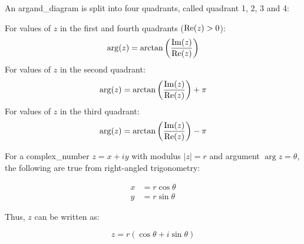        An \gls{argand_diagram} is split into four \glspl{quadrant}, called \gls{quadrant} 1, 2, 3 and 4:

        \begin{center}
        \end{center}


        For values of $z$ in the first and fourth \glspl{quadrant} ($\operatorname{Re}(z)>0$):
        \begin{equation}
            \arg(z)=\arctan\left(\frac{\operatorname{Im}(z)}{\operatorname{Re}(z)}\right)
        \end{equation}
        For values of $z$ in the second \gls{quadrant}:
        \begin{equation}
            \arg(z)=\arctan\left(\frac{\operatorname{Im}(z)}{\operatorname{Re}(z)}\right)+\pi
        \end{equation}
        For values of $z$ in the third \gls{quadrant}:
        \begin{equation}
            \arg(z)=\arctan\left(\frac{\operatorname{Im}(z)}{\operatorname{Re}(z)}\right)-\pi
        \end{equation}

        For a \gls{complex_number} $z=x+iy$ with \gls{modulus} $|z|=r$ and \gls{argument} $\arg z=\theta$, the following are true from right-angled \gls{trigonometry}:

        \begin{align}
            x&=r\cos\theta \\
            y&=r\sin\theta
        \end{align}

        Thus, $z$ can be written as:

        \begin{equation}
            z=r(\cos\theta+i\sin\theta)
        \end{equation}


